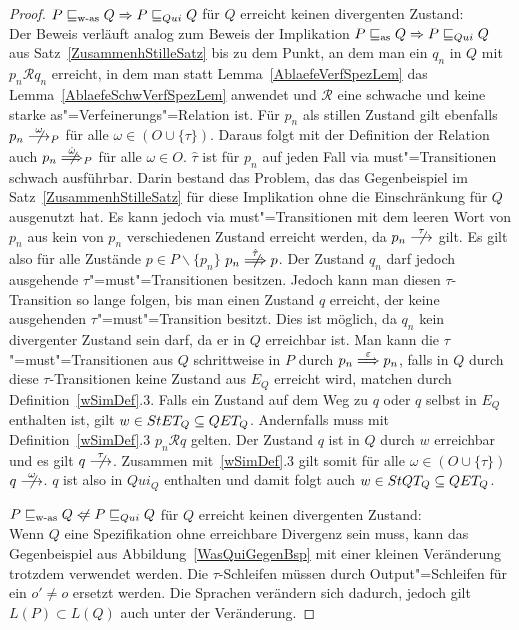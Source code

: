 \begin{proof}
  $P \sqsubseteq _{\mathrm{w}\text{-}\mathrm{as}} Q \Rightarrow P  \sqsubseteq  _{Qui} Q$ für $Q$ erreicht keinen divergenten
  Zustand:\\
  Der Beweis verläuft analog zum Beweis der Implikation $P \sqsubseteq _{\mathrm{as}} Q \Rightarrow
  P  \sqsubseteq  _{Qui} Q$ aus Satz~\ref{ZusammenhStilleSatz} bis zu dem Punkt, an dem man
  ein $q_n$ in $Q$ mit $p_n \mathcal{R} q_n$ erreicht, in dem man statt
  Lemma~\ref{AblaefeVerfSpezLem} das Lemma~\ref{AblaefeSchwVerfSpezLem}
  anwendet und $\mathcal{R}$ eine schwache und keine starke
  as"=Verfeinerungs"=Relation ist. Für $p_n$ als stillen Zustand gilt ebenfalls
  $p_n \nmust[\omega]_P$ für alle $\omega\in (O\cup\{\tau\})$. Daraus folgt mit
  der Definition der Relation \weakmust{} auch $p_n \nweakmust[\hat{\omega}]_P$
  für alle $\omega\in O$. $\hat{\tau}$ ist für $p_n$ auf jeden Fall via \glqq
  must"=Transitionen\grqq{} schwach ausführbar. Darin bestand das Problem, das
  das Gegenbeispiel im Satz~\ref{ZusammenhStilleSatz} für diese Implikation
  ohne die Einschränkung für $Q$ ausgenutzt hat. Es kann jedoch via
  must"=Transitionen mit dem leeren Wort von $p_n$ aus kein von $p_n$
  verschiedenen Zustand erreicht werden, da $p_n \nmust[\tau]$ gilt. Es gilt
  also für alle Zustände $p\in P\backslash \{p_n\}$ $p_n \nweakmust[\hat{\tau}]
  p$. Der Zustand $q_n$ darf jedoch ausgehende $\tau$"=must"=Transitionen
  besitzen. Jedoch kann man diesen $\tau$-Transition so lange folgen, bis man
  einen Zustand $q$ erreicht, der keine ausgehenden $\tau$"=must"=Transition
  besitzt. Dies ist möglich, da $q_n$ kein divergenter Zustand sein darf, da er
  in $Q$ erreichbar ist. Man kann die $\tau$"=must"=Transitionen aus $Q$
  schrittweise in $P$ durch $p_n\weakmust[\varepsilon] p_n$, falls in $Q$ durch
  diese $\tau$-Transitionen keine Zustand aus $E_Q$ erreicht wird, matchen
  durch Definition~\ref{wSimDef}.3. Falls ein Zustand auf dem Weg zu $q$
  oder $q$ selbst in $E_Q$ enthalten ist, gilt $w\in StET _Q \subseteq QET
  _Q$. Andernfalls muss mit Definition~\ref{wSimDef}.3 $p_n\mathcal{R} q$
  gelten. Der Zustand $q$ ist in $Q$ durch $w$ erreichbar und es gilt $q
  \nmust[\tau]$. Zusammen mit~\ref{wSimDef}.3 gilt somit für alle $\omega \in
  (O\cup \{\tau\})$ $q \nmust[\omega]$. $q$ ist also in $Qui_Q$ enthalten und
  damit folgt auch $w \in StQT _Q\subseteq QET _Q$.

  $P \wasRel Q \hspace{0.1cm}\not\hspace{-0.1cm}\Leftarrow P \QRel Q$ für $Q$
  erreicht keinen divergenten Zustand:\\
  Wenn $Q$ eine Spezifikation ohne erreichbare Divergenz sein muss, kann das
  Gegenbeispiel aus Abbildung~\ref{WasQuiGegenBsp} mit einer kleinen
  Veränderung trotzdem verwendet werden. Die $\tau$-Schleifen müssen durch
  Output"=Schleifen für ein $o'\neq o$ ersetzt werden. Die Sprachen verändern
  sich dadurch, jedoch gilt $L(P) \subset L(Q)$ auch unter der Veränderung.
\end{proof}
